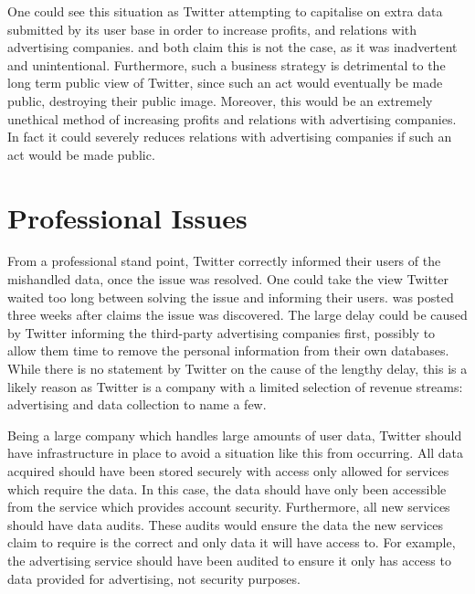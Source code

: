 \documentclass[a4paper, 11pt]{article}
\begin{document}
One could see this situation as Twitter attempting to capitalise on extra data submitted by its user base in order to increase profits, and relations with advertising companies.
\textcite{support_personal_2019} and \textcite{support_twitter_2019} both claim this is not the case, as it was inadvertent and unintentional.
Furthermore, such a business strategy is detrimental to the long term public view of Twitter, since such an act would eventually be made public, destroying their public image.
Moreover, this would be an extremely unethical method of increasing profits and relations with advertising companies.
In fact it could severely reduces relations with advertising companies if such an act would be made public.

\section{Professional Issues}
From a professional stand point, Twitter correctly informed their users of the mishandled data, once the issue was resolved.
One could take the view Twitter waited too long between solving the issue and informing their users.
\textcite{support_twitter_2019} was posted three weeks after \textcite{support_personal_2019} claims the issue was discovered.
The large delay could be caused by Twitter informing the third-party advertising companies first, possibly to allow them time to remove the personal information from their own databases.
While there is no statement by Twitter on the cause of the lengthy delay, this is a likely reason as Twitter is a company with a limited selection of revenue streams: advertising and data collection to name a few.

Being a large company which handles large amounts of user data, Twitter should have infrastructure in place to avoid a situation like this from occurring.
All data acquired should have been stored securely with access only allowed for services which require the data.
In this case, the data should have only been accessible from the service which provides account security.
Furthermore, all new services should have data audits.
These audits would ensure the data the new services claim to require is the correct and only data it will have access to.
For example, the advertising service should have been audited to ensure it only has access to data provided for advertising, not security purposes.
\end{document}
